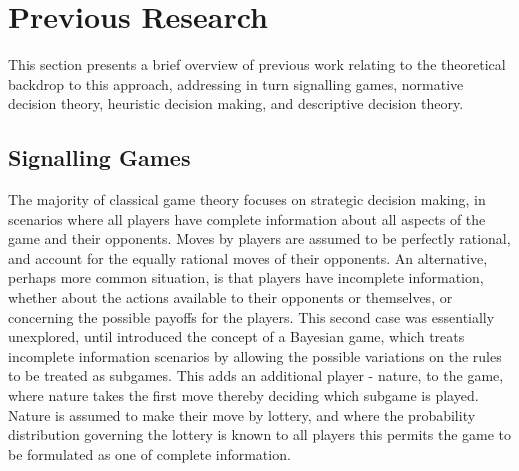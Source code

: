 \section{Previous Research}

\label{sec:lit_review}

This section presents a brief overview of previous work relating to the theoretical backdrop to this approach, addressing in turn signalling games, normative decision theory, heuristic decision making, and descriptive decision theory.


\subsection{Signalling Games}

The majority of classical game theory focuses on strategic decision making, in scenarios where all players have complete information about all aspects of the game and their opponents. Moves by players are assumed to be perfectly rational, and account for the equally rational moves of their opponents.
An alternative, perhaps more common situation, is that players have incomplete information, whether about the actions available to their opponents or themselves, or concerning the possible payoffs for the players.   
This second case was essentially unexplored, until \citet{Harsanyi1967} introduced the concept of a Bayesian game, which treats incomplete information scenarios by allowing the possible variations on the rules to be treated as subgames. This adds an additional player - nature, to the game, where nature takes the first move thereby deciding which subgame is played. Nature is assumed to make their move by lottery, and where the probability distribution governing the lottery is known to all players this permits the game to be formulated as one of complete information. 

